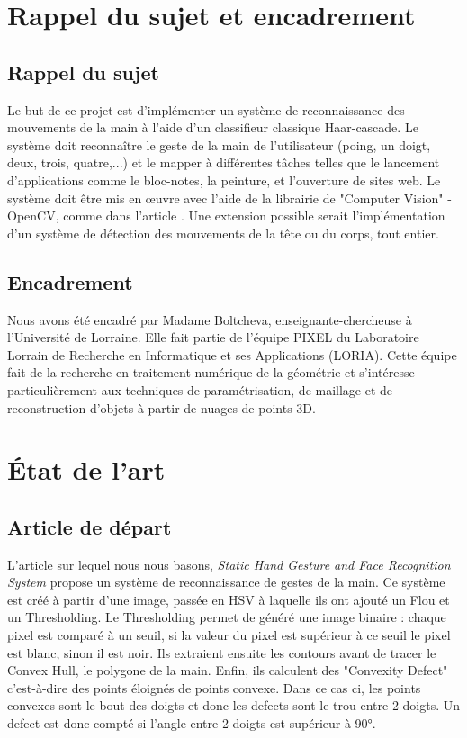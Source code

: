 \documentclass[11pt]{article}
\begin{document}
\newpage

\section{Rappel du sujet et encadrement}
\subsection{Rappel du sujet}

Le but de ce projet est d’implémenter un système de reconnaissance des mouvements de la
main à l’aide d’un classifieur classique Haar-cascade. Le système doit reconnaître le geste de
la main de l’utilisateur (poing, un doigt, deux, trois, quatre,...) et le mapper à différentes tâches
telles que le lancement d’applications comme le bloc-notes, la peinture, et l’ouverture de sites web.
Le système doit être mis en œuvre avec l’aide de la librairie de "Computer Vision" - OpenCV,
comme dans l’article \cite{joshi_static_2021}. Une extension possible serait l’implémentation d’un système de détection
des mouvements de la tête ou du corps, tout entier.

\subsection{Encadrement}
Nous avons été encadré par Madame Boltcheva, enseignante-chercheuse à l'Université de Lorraine. Elle fait partie de l'équipe PIXEL du Laboratoire Lorrain de Recherche en Informatique et ses Applications (LORIA). Cette équipe fait de la recherche en traitement numérique de la géométrie et s'intéresse particulièrement aux techniques de paramétrisation, de maillage et de reconstruction d'objets à partir de nuages de points 3D.


\newpage

\section{\'Etat de l'art}
\subsection{Article de départ}
L'article sur lequel nous nous basons, \textit{Static Hand Gesture and Face Recognition System} \cite{joshi_static_2021} propose un système de reconnaissance de gestes de la main. Ce système est créé à partir d'une image, passée en HSV à laquelle ils ont ajouté un Flou et un Thresholding. Le Thresholding permet de généré une image binaire :  chaque pixel est comparé à un seuil, si la valeur du pixel est supérieur à ce seuil le pixel est blanc, sinon il est noir. Ils extraient ensuite les contours avant de tracer le Convex Hull, le polygone de la main. Enfin, ils calculent des "Convexity Defect" c'est-à-dire des points éloignés de points convexe. Dans ce cas ci, les points convexes sont le bout des doigts et donc les defects sont le trou entre 2 doigts. Un defect est donc compté si l'angle entre 2 doigts est supérieur à 90°. 
\end{document}
